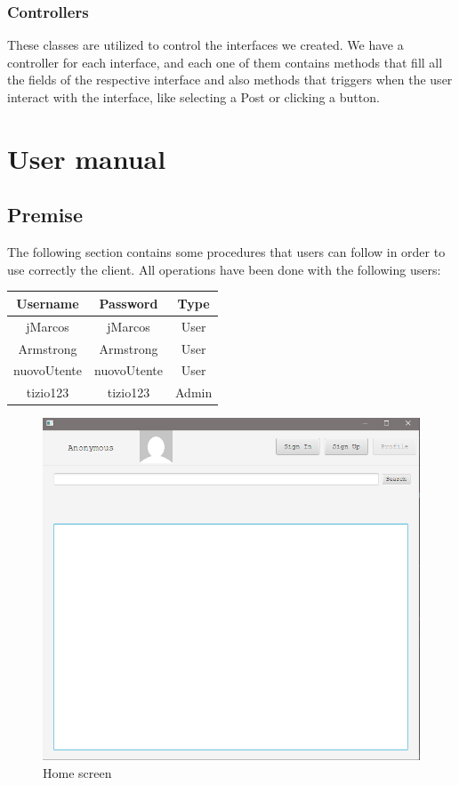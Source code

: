 \documentclass[11pt]{report}
\begin{document}
\subsection{Controllers}
These classes are utilized to control the interfaces we created. We have a controller for each interface, and each one of them contains methods that fill all the fields of the respective interface and also methods that triggers when the user interact with the interface, like selecting a Post or clicking a button.


\chapter{User manual}\label{manual}
\section{Premise}
The following section contains some procedures that users can follow in order to use correctly the client. All operations have been done with the following users:
\begin{table}[h]
\centering
\begin{tabular}{|c|c|c|} 
\hline
\rowcolor[rgb]{0.937,0.937,0.937} Username & Password & Type \\ 
\hline
jMarcos & jMarcos & User \\ 
\hline
Armstrong & Armstrong & User \\ 
\hline
nuovoUtente & nuovoUtente & User \\ 
\hline
tizio123 & tizio123 & Admin \\ 
\hline
\end{tabular}
\end{table}
\begin{figure}[H]
  \centering
  \includegraphics[width=\textwidth,keepaspectratio=true]{img/user_manual/schermataInizialeSenzaLogin.png}
  \caption{Home screen}
  \label{fig:HomeScreen}
\end{figure}
\end{document}
